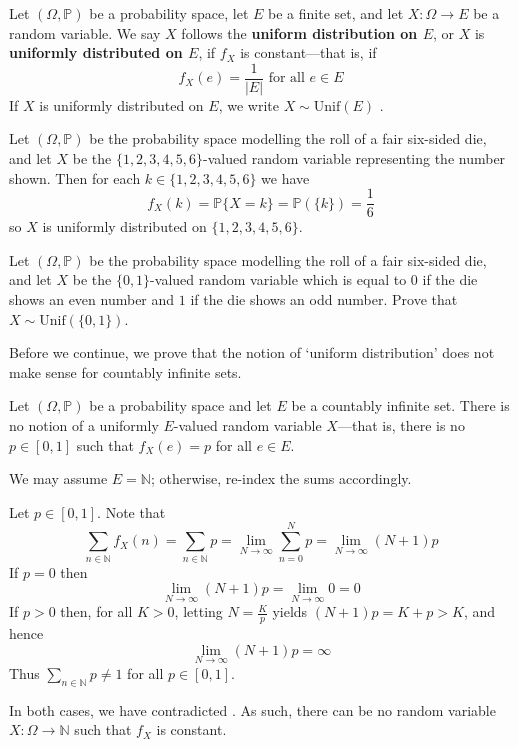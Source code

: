 \begin{definition}
\label{defUniformDistribution}
Let $(\Omega,\mathbb{P})$ be a probability space, let $E$ be a finite set, and let $X : \Omega \to E$ be a random variable. We say $X$ follows the \textbf{uniform distribution on $E$}, or $X$ is \textbf{uniformly distributed on $E$}, if $f_X$ is constant---that is, if
\[ f_X(e)=\frac{1}{|E|} \text{ for all } e \in E \]
If $X$ is uniformly distributed on $E$, we write $X \sim \mathrm{Unif}(E)$ .
\end{definition}

\begin{example}
Let $(\Omega,\mathbb{P})$ be the probability space modelling the roll of a fair six-sided die, and let $X$ be the $\{ 1, 2, 3, 4, 5, 6 \}$-valued random variable representing the number shown. Then for each $k \in \{ 1, 2, 3, 4, 5, 6 \}$ we have
\[ f_X(k) = \mathbb{P}\{X=k\} = \mathbb{P}(\{k\}) = \frac{1}{6} \]
so $X$ is uniformly distributed on $\{ 1, 2, 3, 4, 5, 6 \}$.
\end{example}

\begin{exercise}
Let $(\Omega,\mathbb{P})$ be the probability space modelling the roll of a fair six-sided die, and let $X$ be the $\{0,1\}$-valued random variable which is equal to $0$ if the die shows an even number and $1$ if the die shows an odd number. Prove that $X \sim \mathrm{Unif}(\{0,1\})$.
\end{exercise}

Before we continue, we prove that the notion of `uniform distribution' does not make sense for countably infinite sets. 

\begin{theorem}
Let $(\Omega,\mathbb{P})$ be a probability space and let $E$ be a countably infinite set. There is no notion of a uniformly $E$-valued random variable $X$---that is, there is no $p \in [0,1]$ such that $f_X(e)=p$ for all $e \in E$.
\end{theorem}

\begin{cproof}
We may assume $E=\mathbb{N}$; otherwise, re-index the sums accordingly.

Let $p \in [0,1]$. Note that
\[ \sum_{n \in \mathbb{N}} f_X(n) = \sum_{n \in \mathbb{N}} p = \lim_{N \to \infty} \sum_{n=0}^N p = \lim_{N \to \infty} (N+1)p \]
If $p=0$ then
\[ \lim_{N \to \infty} (N+1)p = \lim_{N \to \infty} 0 = 0 \]
If $p>0$ then, for all $K>0$, letting $N = \frac{K}{p}$ yields $(N+1)p = K+p > K$, and hence
\[ \lim_{N \to \infty} (N+1)p = \infty \]
Thus $\sum_{n \in \mathbb{N}} p \ne 1$ for all $p \in [0,1]$.

In both cases, we have contradicted . As such, there can be no random variable $X : \Omega \to \mathbb{N}$ such that $f_X$ is constant.
\end{cproof}

